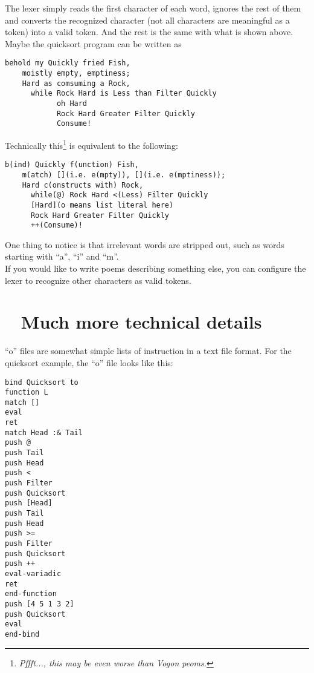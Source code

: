 \documentclass{article}
\begin{document}
The lexer simply reads the first character of each word, ignores the rest of them and converts the recognized character (not all characters are meaningful as a token) into a valid token. And the rest is the same with what is shown above.\\

Maybe the quicksort program can be written as

\begin{Verbatim}[samepage=true]
  behold my Quickly fried Fish,
    moistly empty, emptiness;
    Hard as comsuming a Rock,
      while Rock Hard is Less than Filter Quickly
            oh Hard
            Rock Hard Greater Filter Quickly
            Consume!
\end{Verbatim}


Technically this\footnote{\textit{Pffft..., this may be even worse than Vogon peoms.}} is equivalent to the following:

\begin{Verbatim}[samepage=true]
  b(ind) Quickly f(unction) Fish,
    m(atch) [](i.e. e(mpty)), [](i.e. e(mptiness));
    Hard c(onstructs with) Rock,
      while(@) Rock Hard <(Less) Filter Quickly
      [Hard](o means list literal here)
      Rock Hard Greater Filter Quickly
      ++(Consume)!
\end{Verbatim}

One thing to notice is that irrelevant words are stripped out, such as words starting with ``a'', ``i'' and ``m''.\\

If you would like to write poems describing something else, you can configure the lexer to recognize other characters as valid tokens.

\appendix
\section{~ Much more technical details} \label{appI}
``o'' files are somewhat simple lists of instruction in a text file format. For the quicksort example, the ``o'' file looks like this:

\begin{Verbatim}
bind Quicksort to
function L
match []
eval
ret
match Head :& Tail
push @
push Tail
push Head
push <
push Filter
push Quicksort
push [Head]
push Tail
push Head
push >=
push Filter
push Quicksort
push ++
eval-variadic
ret
end-function
push [4 5 1 3 2]
push Quicksort
eval
end-bind
\end{Verbatim}
\end{document}

